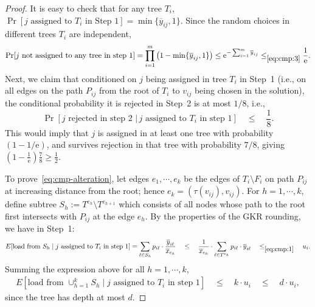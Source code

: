 \documentclass[letterpaper,11pt]{article}
\newcommand{\ox}{\ensuremath{\overline{x}}\xspace}
\newcommand{\oy}{\ensuremath{\overline{y}}\xspace}
\def\oy{\overline{y}}
\def\ox{\overline{x}}
\begin{document}
\begin{proof}
  It is easy to check that for any tree $T_i$, $\Pr[j\text{ assigned to
    $T_i$ in Step~1}]=\min\{\oy_{ij},1\}$.  Since the random choices in
  different trees $T_i$ are independent,
  \begin{gather*}
    \Pr[j\mbox{ not assigned to any tree in step 1}] = \prod_{i=1}^m
    \left( 1- \min\{\oy_{ij},1\} \right) \le \mathrm{e}^{-\sum_{i=1}^m \oy_{ij}}
    \le_{\eqref{eq:cmp:3}} \frac1{\mathrm{e}}.
  \end{gather*}
  Next, we claim that conditioned on $j$ being assigned in tree $T_i$ in
  Step~1 (i.e., on all edges on the path $P_{ij}$ from the root of $T_i$
  to $v_{ij}$ being chosen in the solution), the conditional probability
  it is rejected in Step~2 is at most $1/8$, i.e.,
  \begin{equation}\label{eq:cmp-alteration}
    \Pr[j\mbox{ rejected in step 2 } | \, j \mbox{ assigned to $T_i$ in step 1}]\quad \le \quad \frac18.
  \end{equation}
  This would imply that $j$ is assigned in at least one tree with
  probability $(1-1/\mathrm{e})$, and survives rejection in that tree
  with probability $7/8$, giving $(1-\frac{1}{\mathrm{e}})\frac78 \ge
  \frac12$.

  To prove~\eqref{eq:cmp-alteration}, let edges $e_1,\cdots, e_k$ be the
  edges of $T_i\setminus F_i$ on path $P_{ij}$ at increasing distance
  from the root; hence $e_k = (\tau(v_{ij}), v_{ij})$. For
  $h=1,\cdots,k$, define subtree $S_h:=T^{e_h}\setminus T^{e_{h+1}}$
  which consists of all nodes whose path to the root first intersects
  with $P_{ij}$ at the edge $e_h$. By the properties of the GKR
  rounding, we have in Step~1:
  \begin{gather*}
    E[\mbox{load from }S_h \mid  j\mbox{ assigned to $T_i$ in step~1} ]  =
    \sum_{\ell\in S_h} p_{i\ell}\cdot
    \frac{\oy_{i\ell}}{\ox_{e_h}}\quad \le \quad \frac1{\ox_{e_h}} \cdot
    \sum_{\ell\in T^{e_h}} p_{i\ell}\cdot \oy_{i\ell} \quad
    \le_{\eqref{eq:cmp:1}} \quad u_i.
  \end{gather*}
  Summing the expression above for all $h=1,\cdots,k$,
  \begin{gather*}
    E[\mbox{load from }\cup_{h=1}^k S_h \mid j\mbox{ assigned to
    $T_i$ in step~1}] \quad \le \quad k\cdot u_i \quad \le \quad d\cdot u_i,
  \end{gather*}
  since the tree has depth at most $d$.


\end{proof}
\end{document}
